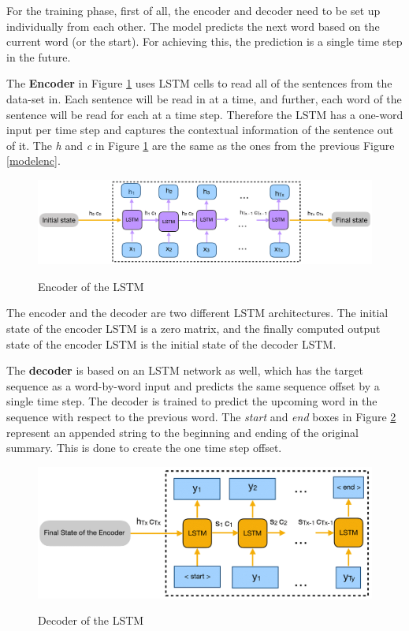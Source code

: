 For the training phase, first of all, the encoder and decoder need to be set up individually from each other. The model predicts the next word based on the current word (or the start). For achieving this, the prediction is a single time step in the future. 

The \textbf{Encoder} in Figure \ref{trainenc} uses LSTM cells to read all of the sentences from the data-set in. Each sentence will be read in at a time, and further, each word of the sentence will be read for each at a time step. Therefore the LSTM has a one-word input per time step and captures the contextual information of the sentence out of it.  The \textit{h} and \textit{c} in Figure \ref{trainenc} are the same as the ones from the previous Figure \ref{modelenc}. 

\begin{figure}
	\begin{center}
		\includegraphics[width=6in]{photos/trainenc-1}\\
		\caption{Encoder of the LSTM}\label{trainenc}
	\end{center}
\end{figure}

The encoder and the decoder are two different LSTM architectures. The initial state of the encoder LSTM is a zero matrix, and the finally computed output state of the encoder LSTM is the initial state of the decoder LSTM.

The \textbf{ decoder} is based on an LSTM network as well, which has the target sequence as a word-by-word input and predicts the same sequence offset by a single time step. The decoder is trained to predict the upcoming word in the sequence with respect to the previous word. The \textit{start} and \textit{end} boxes in Figure \ref{traindec} represent an appended string to the beginning and ending of the original summary. This is done to create the one time step offset.

\begin{figure}
	\begin{center}
		\includegraphics[width=6in]{photos/traindec-1}\\
		\caption{Decoder of the LSTM}\label{traindec}
	\end{center}
\end{figure}

